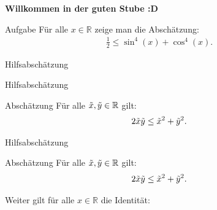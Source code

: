 \documentclass[10pt]{beamer}
\title{}
\author{Artur's \( \oint \) Mathematikstübchen}
\date{}
\def\bR{\mathbb{R}}
\begin{document}

\begin{frame}
    \begin{center}
        \textbf{\huge Willkommen in der guten Stube \newline \newline :D}
    \end{center}
\end{frame}




\begin{frame}
    \begin{alertblock}{Aufgabe}
        Für alle \( x \in \bR \) zeige man die Abschätzung:
        \begin{align*}
            \frac{1}{2}
            \leq \sin^{4}\left( x \right) + \cos^{4}\left( x \right).
        \end{align*}
    \end{alertblock}
\end{frame}



\begin{frame}{Hilfsabschätzung}
    
\end{frame}



\begin{frame}{Hilfsabschätzung}
    \begin{block}{Abschätzung}
        Für alle \( \Tilde{x}, \Tilde{y} \in \bR \) gilt:
        \begin{align*}
            2\Tilde{x}\Tilde{y}
            \leq \Tilde{x}^{2} + \Tilde{y}^{2}.
        \end{align*}
    \end{block}
\end{frame}



\begin{frame}{Hilfsabschätzung}
    \begin{block}{Abschätzung}
        Für alle \( \Tilde{x}, \Tilde{y} \in \bR \) gilt:
        \begin{align*}
            2\Tilde{x}\Tilde{y}
            \leq \Tilde{x}^{2} + \Tilde{y}^{2}.
        \end{align*}
    \end{block}
    Weiter gilt für alle \( x \in \bR \) die Identität:
\end{frame}
\end{document}
